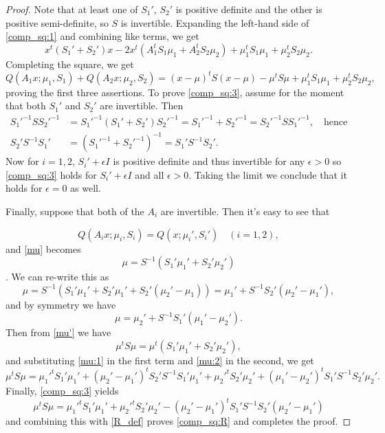 \documentclass[12pt,leqno]{article}
\begin{document}
\begin{proof}
  Note that at least one of $S_1'$, $S_2'$ is positive definite and the other is positive semi-definite,
so $S$ is invertible.  Expanding the left-hand side of \eqref{comp_sq:1} and combining
like terms, we get
$$
x^t(S_1'+ S_2')x -2x^t(A_1^tS_1\mu_1+ A_2^tS_2\mu_2) 
+ \mu_1^tS_1\mu_1 + \mu_2^tS_2\mu_2.
$$
Completing the square, we get
$$
Q(A_1x;\mu_1,S_1) + Q(A_2x;\mu_2,S_2) = (x-\mu)^tS(x-\mu) -\mu^tS\mu + \mu_1^tS_1\mu_1 + \mu_2^tS_2\mu_2,
$$
proving the first three assertions.
To prove \eqref{comp_sq:3}, assume for the moment that both $S_1'$ and $S_2'$ are invertible.
Then
\begin{align*}
S_1'^{-1}SS_2'^{-1} &= S_1'^{-1}(S_1'+S_2')S_2'^{-1} = S_1'^{-1}+S_2'^{-1} = S_2'^{-1}SS_1'^{-1},\quad\text{hence}\\
S_2'S^{-1}S_1' &= (S_1'^{-1}+S_2'^{-1})^{-1} = S_1'S^{-1}S_2'.
\end{align*}
Now for $i = 1,2$, $S_i'+\epsilon{I}$ is positive definite and thus invertible for any $\epsilon > 0$
so \eqref{comp_sq:3} holds for $S_i'+\epsilon{I}$ and all $\epsilon > 0$.  Taking the limit
we conclude that it holds for $\epsilon = 0$ as well.

Finally, suppose that both of the $A_i$ are invertible. Then it's easy to see that

\begin{equation}\label{comp_sq:4}
Q(A_ix;\mu_i,S_i) = Q(x;\mu_i',S_i')\quad(i = 1,2),
\end{equation}
and \eqref{mu} becomes
\begin{equation} \label{mu'}
\mu = S^{-1}(S_1'\mu_1' + S_2'\mu_2')
\end{equation}.
We can re-write this as
\begin{equation}\label{mu:1}
\mu = S^{-1}(S_1'\mu_1' + S_2'\mu_1' + S_2'(\mu_2'-\mu_1)) = \mu_1' + S^{-1}S_2'(\mu_2'-\mu_1'),
\end{equation}
and by symmetry we have
\begin{equation}\label{mu:2}
  \mu = \mu_2' + S^{-1}S_1'(\mu_1'-\mu_2').
\end{equation}
Then from \eqref{mu'} we have
$$
\mu^tS\mu = \mu^t(S_1'\mu_1' + S_2'\mu_2'),
$$
and substituting \eqref{mu:1} in the first term and \eqref{mu:2} in the second, we get
$$
\mu^tS\mu = \mu_1'^tS_1'\mu_1' + (\mu_2'-\mu_1')^tS_2'S^{-1}S_1'\mu_1' + \mu_2'^tS_2'\mu_2'+(\mu_1'-\mu_2')^tS_1'S^{-1}S_2'\mu_2'.
$$
Finally, \eqref{comp_sq:3} yields
$$
\mu^tS\mu = \mu_1'^tS_1'\mu_1' + \mu_2'^tS_2'\mu_2' - (\mu_2'-\mu_1')^tS_1'S^{-1}S_2'(\mu_2'-\mu_1')
$$
and combining this with \eqref{R_def} proves \eqref{comp_sq:R} and completes the proof.
\end{proof}
\end{document}
